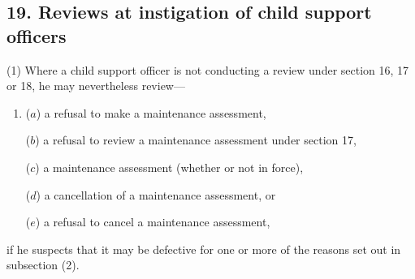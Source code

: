\documentclass[12pt,a4paper]{article}
\begin{document}

%
%
%
%
%
%

\subsection{19. Reviews at instigation of child support officers}

(1) Where a child support officer is not conducting a review under section 16, 17 or 18, he may nevertheless review—
\begin{enumerate}\item[]
($a$) a refusal to make a maintenance assessment,

($b$) a refusal to review a maintenance assessment under section 17,

($c$) a maintenance assessment (whether or not in force),

($d$) a cancellation of a maintenance assessment, or

($e$) a refusal to cancel a maintenance assessment,
\end{enumerate}
if he suspects that it may be defective for one or more of the reasons set out in subsection (2).
\end{document}
